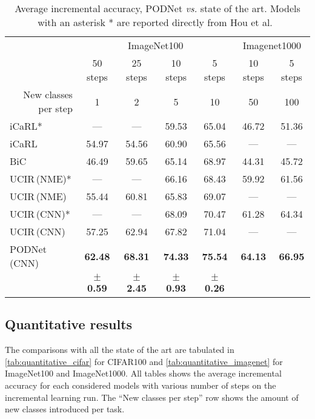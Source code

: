 \documentclass[runningheads]{llncs}
\begin{document}
 \begin{table*}[t]
\caption{Average incremental accuracy, PODNet \textit{vs.} state of the art. Models with an asterisk * are reported directly from Hou et al.~\cite{hou2019ucir}}
\label{tab:quantitative_imagenet}
\centering
\begin{tabular}{@{}l|cccc|cc@{}}
 \toprule
 & \multicolumn{4}{c|}{ImageNet100} & \multicolumn{2}{c}{Imagenet1000} \\
& 50 steps & 25 steps & 10 steps & 5 steps & 10 steps & 5 steps\\
 \multicolumn{1}{r|}{New classes per step} & 1 & 2 & 5 & 10 & 50 & 100\\
 \midrule
 iCaRL* \cite{rebuffi2017icarl}        & ---   & ---   & 59.53  & 65.04 & 46.72 & 51.36\\
 iCaRL \cite{rebuffi2017icarl}         & 54.97 & 54.56 & 60.90  & 65.56 & ---   & --- \\
 BiC \cite{wu2019bias_correction} & 46.49 & 59.65 & 65.14  & 68.97 & 44.31   & 45.72\\
 UCIR\,{\scriptsize (NME)}* \cite{hou2019ucir}    & ---   & ---   & 66.16  & 68.43 & 59.92 & 61.56\\
 UCIR\,{\scriptsize (NME)} \cite{hou2019ucir}     & 55.44 & 60.81 & 65.83  & 69.07 & ---   & --- \\
 UCIR\,{\scriptsize (CNN)}* \cite{hou2019ucir}    & ---   & ---   & 68.09  & 70.47 & 61.28 & 64.34\\
 UCIR\,{\scriptsize (CNN)} \cite{hou2019ucir}     & 57.25 & 62.94 & 67.82  & 71.04 & ---   & --- \\
PODNet\,{\scriptsize (CNN)}                & \textbf{62.48} & \textbf{68.31} & \textbf{74.33} & \textbf{75.54} & \textbf{64.13} & \textbf{66.95}\\

  & \scriptsize{\textbf{$\pm$ 0.59}} & \scriptsize{\textbf{$\pm$ 2.45}} & \scriptsize{\textbf{$\pm$ 0.93}} & \scriptsize{\textbf{$\pm$ 0.26}} & &\\

 \bottomrule
\end{tabular}
\end{table*} 
\subsection{Quantitative results}
\label{sec:quantitative_results}

The comparisons with all the state of the art are tabulated in \autoref{tab:quantitative_cifar} for CIFAR100 and \autoref{tab:quantitative_imagenet} for ImageNet100 and ImageNet1000. All tables shows the average incremental accuracy for each considered models with various number of steps on the incremental learning run. The ``New classes per step'' row shows the amount of new classes introduced per task. 
\end{document}
